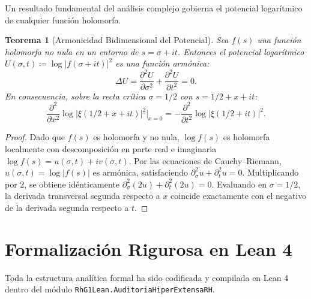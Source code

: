 \documentclass[11pt,a4paper]{article}
\newtheorem{theorem}{Teorema}[section]
\theoremstyle{definition}
\theoremstyle{remark}
\begin{document}
Un resultado fundamental del análisis complejo gobierna el potencial logarítmico de cualquier función holomorfa.

\begin{theorem}[Armonicidad Bidimensional del Potencial]
Sea $f(s)$ una función holomorfa no nula en un entorno de $s = \sigma + it$. Entonces el potencial logarítmico $U(\sigma, t) \coloneqq \log |f(\sigma + it)|^2$ es una función armónica:
\begin{equation}
\Delta U = \frac{\partial^2 U}{\partial \sigma^2} + \frac{\partial^2 U}{\partial t^2} = 0.
\end{equation}
En consecuencia, sobre la recta crítica $\sigma = 1/2$ con $s = 1/2 + x + it$:
\begin{equation}
\frac{\partial^2}{\partial x^2} \log |\xi(1/2 + x + it)|^2 \Big|_{x=0} = -\frac{\partial^2}{\partial t^2} \log |\xi(1/2 + it)|^2.
\end{equation}
\end{theorem}

\begin{proof}
Dado que $f(s)$ es holomorfa y no nula, $\log f(s)$ es holomorfa localmente con descomposición en parte real e imaginaria $\log f(s) = u(\sigma, t) + i v(\sigma, t)$. Por las ecuaciones de Cauchy--Riemann, $u(\sigma, t) = \log |f(s)|$ es armónica, satisfaciendo $\partial_\sigma^2 u + \partial_t^2 u = 0$. Multiplicando por 2, se obtiene idénticamente $\partial_\sigma^2 (2u) + \partial_t^2 (2u) = 0$. Evaluando en $\sigma = 1/2$, la derivada transversal segunda respecto a $x$ coincide exactamente con el negativo de la derivada segunda respecto a $t$.
\end{proof}

\section{Formalización Rigurosa en Lean 4}

Toda la estructura analítica formal ha sido codificada y compilada en Lean 4 dentro del módulo \texttt{RhG1Lean.AuditoriaHiperExtensaRH}.
\end{document}

